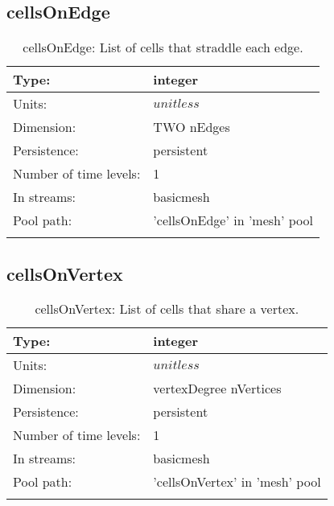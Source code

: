 \subsection[cellsOnEdge]{cellsOnEdge}
\label{subsec:var_sec_mesh_cellsOnEdge}
\begin{center}
\begin{longtable}{| p{2.0in} | p{4.0in} |}
        \hline 
        Type: & integer \\
        \hline 
        Units: & $unitless$ \\
        \hline 
        Dimension: & TWO nEdges \\
        \hline 
        Persistence: & persistent \\
        \hline 
        Number of time levels: & 1 \\
        \hline 
		 In streams: &  basicmesh \\
        \hline 
            Pool path: & 'cellsOnEdge' in 'mesh' pool
 \\
		 \hline 
    \caption{cellsOnEdge: List of cells that straddle each edge.}
\end{longtable}
\end{center}
\subsection[cellsOnVertex]{cellsOnVertex}
\label{subsec:var_sec_mesh_cellsOnVertex}
\begin{center}
\begin{longtable}{| p{2.0in} | p{4.0in} |}
        \hline 
        Type: & integer \\
        \hline 
        Units: & $unitless$ \\
        \hline 
        Dimension: & vertexDegree nVertices \\
        \hline 
        Persistence: & persistent \\
        \hline 
        Number of time levels: & 1 \\
        \hline 
		 In streams: &  basicmesh \\
        \hline 
            Pool path: & 'cellsOnVertex' in 'mesh' pool
 \\
		 \hline 
    \caption{cellsOnVertex: List of cells that share a vertex.}
\end{longtable}
\end{center}
